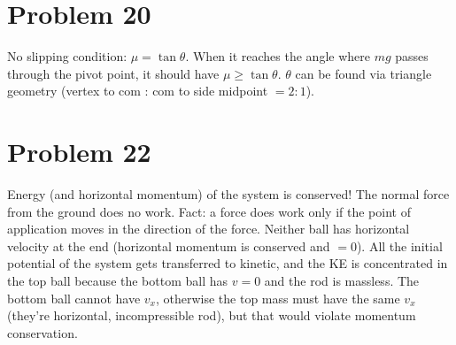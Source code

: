 \documentclass[11pt]{article}
\begin{document}
\section*{Problem 20}
No slipping condition: $\mu=\tan\theta$.
When it reaches the angle where $mg$ passes through the pivot point, it should have $\mu\ge\tan\theta$.
$\theta$ can be found via triangle geometry (vertex to com : com to side midpoint $=2:1$).

\begin{center}
\end{center}

\section*{Problem 22}
Energy (and horizontal momentum) of the system is conserved! The normal force from the ground does no work.
Fact: a force does work only if the point of application moves in the direction of the force.
Neither ball has horizontal velocity at the end (horizontal momentum is conserved and $=0$).
All the initial potential of the system gets transferred to kinetic, and the KE is concentrated in the top ball because the bottom ball has $v=0$ and the rod is massless.
The bottom ball cannot have $v_x$, otherwise the top mass must have the same $v_x$ (they're horizontal, incompressible rod), but that would violate momentum conservation.
\end{document}
